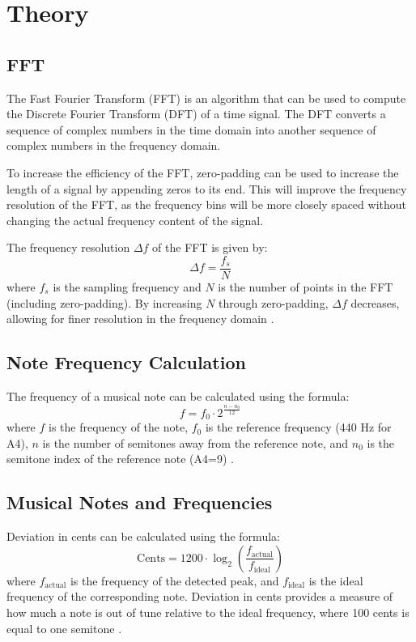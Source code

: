 \chapter{Theory}

\section{FFT} 

The Fast Fourier Transform (FFT) is an algorithm that can be used to compute the Discrete Fourier Transform (DFT) of a time signal. The DFT converts a sequence of complex numbers in the time domain into another sequence of complex numbers in the frequency domain. 

To increase the efficiency of the FFT, zero-padding can be used to increase the length of a signal by appending zeros to its end. This will improve the frequency resolution of the FFT, as the frequency bins will be more closely spaced without changing the actual frequency content of the signal. 

The frequency resolution \( \Delta f \) of the FFT is given by:
\begin{equation}
\Delta f = \frac{f_s}{N}
\label{eq:freq_resolution}
\end{equation}
where \( f_s \) is the sampling frequency and \( N \) is the number of points in the FFT (including zero-padding). By increasing \( N \) through zero-padding, \( \Delta f \) decreases, allowing for finer resolution in the frequency domain \cite{Svensson2025}. 


\section{Note Frequency Calculation}

The frequency of a musical note can be calculated using the formula:
\begin{equation}
f = f_0 \cdot 2^{\frac{n - n_0}{12}}
\label{eq:note_freq}
\end{equation}
where \( f \) is the frequency of the note, \( f_0 \) is the reference frequency (440 Hz for A4), \( n \) is the number of semitones away from the reference note, and \( n_0 \) is the semitone index of the reference note (A4=9) \cite{Svensson2025}.


\section{Musical Notes and Frequencies}

Deviation in cents can be calculated using the formula:
\begin{equation}
\text{Cents} = 1200 \cdot \log_2\left(\frac{f_{\text{actual}}}{f_{\text{ideal}}}\right)
\label{eq:deviation_cents}
\end{equation}
where \( f_{\text{actual}} \) is the frequency of the detected peak, and \( f_{\text{ideal}} \) is the ideal frequency of the corresponding note. Deviation in cents provides a measure of how much a note is out of tune relative to the ideal frequency, where 100 cents is equal to one semitone \cite{Svensson2025}.
